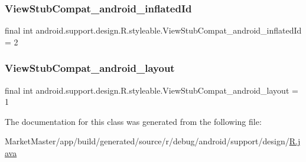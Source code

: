 \subsubsection{\texorpdfstring{View\+Stub\+Compat\+\_\+android\+\_\+inflated\+Id}{ViewStubCompat\_android\_inflatedId}}
{\footnotesize\ttfamily final int android.\+support.\+design.\+R.\+styleable.\+View\+Stub\+Compat\+\_\+android\+\_\+inflated\+Id = 2\hspace{0.3cm}{\ttfamily [static]}}

\mbox{\label{classandroid_1_1support_1_1design_1_1R_1_1styleable_ae3ebfa5defbb371675ed847339ac19af}} 
\subsubsection{\texorpdfstring{View\+Stub\+Compat\+\_\+android\+\_\+layout}{ViewStubCompat\_android\_layout}}
{\footnotesize\ttfamily final int android.\+support.\+design.\+R.\+styleable.\+View\+Stub\+Compat\+\_\+android\+\_\+layout = 1\hspace{0.3cm}{\ttfamily [static]}}



The documentation for this class was generated from the following file\+:\begin{DoxyCompactItemize}
\item 
Market\+Master/app/build/generated/source/r/debug/android/support/design/\mbox{\hyperlink{debug_2android_2support_2design_2R_8java}{R.\+java}}\end{DoxyCompactItemize}
